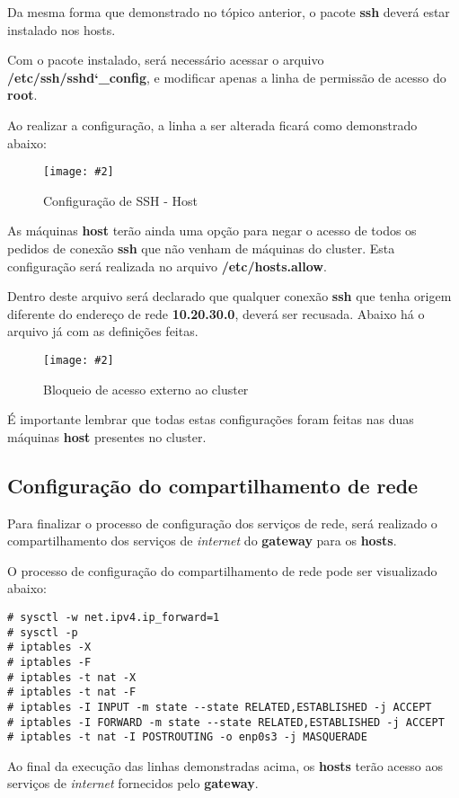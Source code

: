 \documentclass[
	12pt,				%
	openany,			%
	a4paper,			%
	chapter=TITLE,		%
	section=TITLE,		%
	english,
	brazil				%
]{abntex2}
\newcommand{\includeImage}[3] {

\begin{figure}[H]
 	 \centering
  		\texttt{[image: \#2]}
  	\caption{#3}
\end{figure}

}
\begin{document}
Da mesma forma que demonstrado no tópico anterior, o pacote \textbf{ssh} deverá estar instalado nos hosts.

Com o pacote instalado, será necessário acessar o arquivo \textbf{/etc/ssh/sshd\char`_config}, e modificar apenas a linha de permissão de acesso do \textbf{root}. 

Ao realizar a configuração, a linha a ser alterada ficará como demonstrado abaixo:
\includeImage{0.7}{imgs/4_configuracao_servicos_rede/1_host_1.png}{Configuração de SSH - Host}

As máquinas \textbf{host} terão ainda uma opção para negar o acesso de todos os pedidos de conexão \textbf{ssh} que não venham de máquinas do cluster. Esta configuração será realizada no arquivo \textbf{/etc/hosts.allow}.

Dentro deste arquivo será declarado que qualquer conexão \textbf{ssh} que tenha origem diferente do endereço de rede \textbf{10.20.30.0}, deverá ser recusada. Abaixo há o arquivo já com as definições feitas.

\includeImage{0.5}{imgs/4_configuracao_servicos_rede/1_host_2.png}{Bloqueio de acesso externo ao cluster}


É importante lembrar que todas estas configurações foram feitas nas duas máquinas \textbf{host} presentes no cluster.


\subsection{Configuração do compartilhamento de rede}

Para finalizar o processo de configuração dos serviços de rede, será realizado o compartilhamento dos serviços de \textit{internet} do \textbf{gateway} para os \textbf{hosts}.

O processo de configuração do compartilhamento de rede pode ser visualizado abaixo:

\begin{lstlisting}
# sysctl -w net.ipv4.ip_forward=1
# sysctl -p 
# iptables -X
# iptables -F
# iptables -t nat -X
# iptables -t nat -F 
# iptables -I INPUT -m state --state RELATED,ESTABLISHED -j ACCEPT
# iptables -I FORWARD -m state --state RELATED,ESTABLISHED -j ACCEPT 
# iptables -t nat -I POSTROUTING -o enp0s3 -j MASQUERADE
\end{lstlisting} 

Ao final da execução das linhas demonstradas acima, os \textbf{hosts} terão acesso aos serviços de \textit{internet} fornecidos pelo \textbf{gateway}.
 
\end{document}

